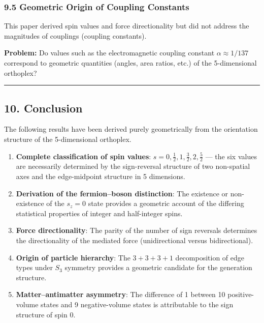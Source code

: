 \documentclass[a4paper,11pt]{article}
\providecommand{\tightlist}{\setlength{\itemsep}{0pt}\setlength{\parskip}{0pt}}
\begin{document}
\subsubsection*{9.5 Geometric Origin of Coupling Constants}

This paper derived spin values and force directionality but did not address the magnitudes of couplings (coupling constants).

\textbf{Problem:} Do values such as the electromagnetic coupling constant $\alpha \approx 1/137$ correspond to geometric quantities (angles, area ratios, etc.) of the 5-dimensional orthoplex?

\begin{center}\rule{0.5\linewidth}{0.5pt}\end{center}

\subsection*{10. Conclusion}

The following results have been derived purely geometrically from the orientation structure of the 5-dimensional orthoplex.

\begin{enumerate}
\def\labelenumi{\arabic{enumi}.}
\tightlist
\item
  \textbf{Complete classification of spin values}:
  $s = 0, \frac{1}{2}, 1, \frac{3}{2}, 2, \frac{5}{2}$
  --- the six values are necessarily determined by the sign-reversal structure of two non-spatial axes and the edge-midpoint structure in 5 dimensions.
\item
  \textbf{Derivation of the fermion--boson distinction}: The existence or non-existence of the $s_z = 0$ state provides a geometric account of the differing statistical properties of integer and half-integer spins.
\item
  \textbf{Force directionality}: The parity of the number of sign reversals determines the directionality of the mediated force (unidirectional versus bidirectional).
\item
  \textbf{Origin of particle hierarchy}: The $3 + 3 + 3 + 1$ decomposition of edge types under $S_3$ symmetry provides a geometric candidate for the generation structure.
\item
  \textbf{Matter--antimatter asymmetry}: The difference of 1 between 10 positive-volume states and 9 negative-volume states is attributable to the sign structure of spin 0.
\end{enumerate}
\end{document}
